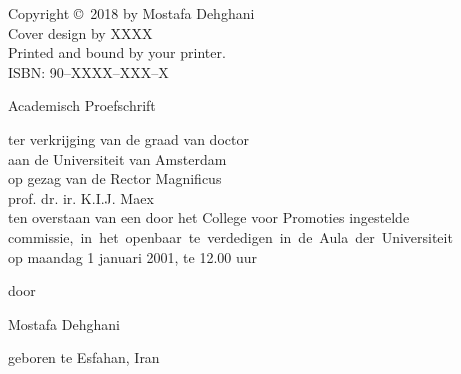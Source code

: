 {%
%
\noindent%
Copyright \copyright\ 2018 by Mostafa Dehghani\\[2ex] %
Cover design by XXXX \\                       %
Printed and bound by your printer.\\[2ex]           %
ISBN: 90--XXXX--XXX--X                              %



\clearpage
\par\vskip 2cm
\begin{center}
\printtitle
\par\vspace {6cm}
{\large \sc Academisch Proefschrift}
\par\vspace {1cm}
{\large ter verkrijging van de graad van doctor\\
aan de Universiteit van Amsterdam\\
op gezag van de Rector Magnificus\\
prof. dr. ir. K.I.J. Maex\\                                 %
ten overstaan van een door het College voor Promoties ingestelde\\
\mbox{commissie, in het openbaar te verdedigen in de Aula der Universiteit}\\        %
op maandag 1 januari 2001, te 12.00 uur \\ }        %
\par\vspace {1cm} {\large door}
\par \vspace {1cm} %
{\Large Mostafa Dehghani}                        %
\par\vspace {1cm} %
{\large geboren te Esfahan, Iran} %
\end{center}

}
